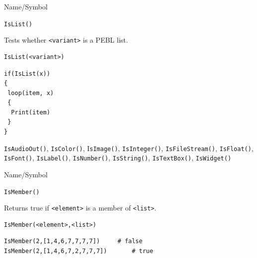 \begin{desc}{Name/Symbol}
\item[Name/Symbol]	\verb+IsList()+

\item[Description]	Tests whether \verb+<variant>+ is a PEBL list.

\item[Usage]
\begin{verbatim}
IsList(<variant>)
\end{verbatim}

\item[Example]	
\begin{verbatim}
if(IsList(x))
{
 loop(item, x)
 {
  Print(item)
 }
}
\end{verbatim}

\item[See Also] \verb+IsAudioOut()+, \verb+IsColor()+,
  I\verb+sImage()+, \verb+IsInteger()+, \verb+IsFileStream()+,
  \verb+IsFloat()+, \verb+IsFont()+, \verb+IsLabel()+,
  \verb+IsNumber()+, \verb+IsString()+, \verb+IsTextBox()+,
  \verb+IsWidget()+
\end{desc}

\begin{desc}{Name/Symbol}
\item[Name/Symbol]	\verb+IsMember()+

\item[Description]	Returns true if \verb+<element>+ is a member of \verb+<list>+.

\item[Usage]		
\begin{verbatim}
IsMember(<element>,<list>)
\end{verbatim}

\item[Example]	
\begin{verbatim}
IsMember(2,[1,4,6,7,7,7,7])		# false
IsMember(2,[1,4,6,7,2,7,7,7]) 		# true
\end{verbatim}

\item[See Also]	
\end{desc}

